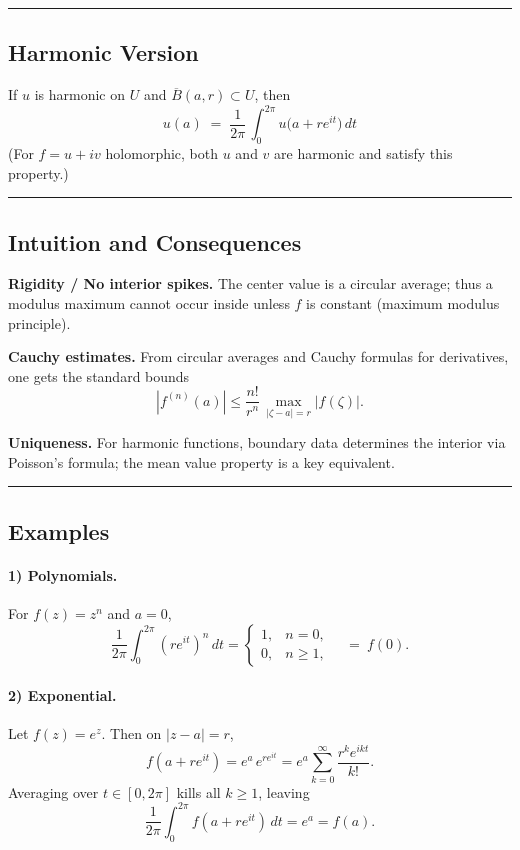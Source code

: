 \documentclass[11pt]{article}
\begin{document}
\bigskip\hrule\bigskip

\subsection*{Harmonic Version}

If $u$ is harmonic on $U$ and $\overline{B}(a,r)\subset U$, then
\[
\boxed{\; u(a)\;=\;\frac{1}{2\pi}\,\int_{0}^{2\pi} u\!\big(a+re^{it}\big)\,dt \;}
\]
(For $f=u+iv$ holomorphic, both $u$ and $v$ are harmonic and satisfy this property.)

\bigskip\hrule\bigskip

\subsection*{Intuition and Consequences}

\medskip

\noindent\textbf{Rigidity / No interior spikes.}
The center value is a circular average; thus a modulus maximum cannot occur inside unless $f$ is constant (maximum modulus principle).

\medskip

\noindent\textbf{Cauchy estimates.}
From circular averages and Cauchy formulas for derivatives, one gets the standard bounds
\[
|f^{(n)}(a)| \le \frac{n!}{r^{n}}\,\max_{|\zeta-a|=r}|f(\zeta)|.
\]

\medskip

\noindent\textbf{Uniqueness.}
For harmonic functions, boundary data determines the interior via Poisson’s formula; the mean value property is a key equivalent.

\bigskip\hrule\bigskip

\subsection*{Examples}

\paragraph{1) Polynomials.}
For $f(z)=z^{n}$ and $a=0$,
\[
\frac{1}{2\pi}\int_{0}^{2\pi} (re^{it})^{n}\,dt
=\begin{cases}
	1,& n=0,\\
	0,& n\ge 1,
\end{cases}
\quad=\ f(0).
\]

\medskip

\paragraph{2) Exponential.}
Let $f(z)=e^{z}$. Then on $|z-a|=r$,
\[
f(a+re^{it})=e^{a}\,e^{re^{it}}
=e^{a}\sum_{k=0}^{\infty}\frac{r^{k}e^{ikt}}{k!}.
\]
Averaging over $t\in[0,2\pi]$ kills all $k\ge 1$, leaving
\[
\frac{1}{2\pi}\int_{0}^{2\pi} f(a+re^{it})\,dt
=e^{a}=f(a).
\]
\end{document}

